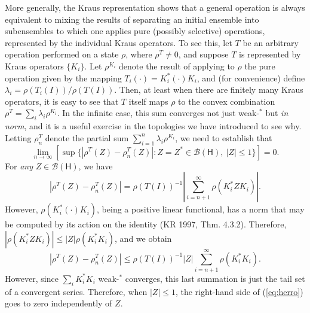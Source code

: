 \documentclass[12pt]{article}
\newcommand{\alg}[1]{\mbox{$\mathcal{#1}$}}
\newcommand{\hil}[1]{\mbox{$\mathsf{#1}$}}
\begin{document}
            More generally, the Kraus representation shows that a general 
      operation is always equivalent to mixing the results of separating 
      an initial 
      ensemble into subensembles to which one applies pure (possibly 
      selective) operations, represented by the individual Kraus 
      operators.  To see this, let $T$ be an arbitrary operation 
      performed on a 
      state $\rho$, where $\rho^{T}\not=0$, and suppose $T$ is 
      represented by Kraus operators $\{K_{i}\}$.  Let $\rho^{K_{i}}$ 
      denote the result of applying to $\rho$ the pure operation given by the 
      mapping $T_{i}(\cdot)=K_{i}^{*}(\cdot)K_{i}$, and (for 
      convenience) define 
      $\lambda_{i}=\rho(T_{i}(I))/\rho(T(I))$.  Then, at least when 
      there are finitely many Kraus operators, it is easy to see 
      that $T$ itself maps $\rho$ to the convex combination
            $\rho^{T}=\sum_{i}\lambda_{i}\rho^{K_{i}}$.  In the infinite 
            case, this sum converges not just weak-$^{*}$ but \emph{in 
            norm}, and it is a useful exercise in the topologies we 
            have introduced 
            to see why.  Letting $\rho_{n}^{T}$ denote the partial 
            sum $\sum_{i=1}^{n}\lambda_{i}\rho^{K_{i}}$, we need to establish that
            \begin{equation}
             \lim_{n\rightarrow\infty}[\sup\{|\rho^{T}(Z)-\rho_{n}^{T}(Z)|: 
Z=Z^{*}\in\alg{B}(\hil{H}),\ |Z|\leq 1\}]=0.
\end{equation}
For \emph{any} $Z\in\alg{B}(\hil{H})$, we have
\begin{equation}
|\rho^{T}(Z)-\rho_{n}^{T}(Z)|=\rho(T(I))^{-1}|\sum_{i=n+1}^{\infty}\rho(K_{i}^{*}ZK_{i})|.
\end{equation}
However, $\rho(K_{i}^{*}(\cdot)K_{i})$, being a positive linear 
functional, has a norm that may be computed by its action on the 
identity (KR 1997, Thm. 4.3.2).  Therefore, $|\rho(K_{i}^{*}ZK_{i})|\leq 
|Z|\rho(K_{i}^{*}K_{i})$, and we obtain 
\begin{equation}\label{eq:herro}
|\rho^{T}(Z)-\rho_{n}^{T}(Z)|\leq \rho(T(I))^{-1}|Z|\sum_{i=n+1}^{\infty}\rho(K_{i}^{*}K_{i}).
\end{equation}
However, since $\sum_{i}K_{i}^{*}K_{i}$ weak-$^{*}$ converges, this last 
summation is just the tail set of a convergent series.  Therefore, when 
$|Z|\leq 1$, the right-hand side of (\ref{eq:herro}) goes to zero independently of $Z$.  
        
\end{document}
